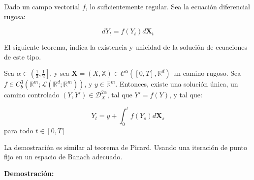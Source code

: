 Dado un campo vectorial $f$, lo suficientemente regular. Sea la ecuación diferencial rugosa:

\[
	dY_t = f(Y_t) d\mathbf{X}_t
\]

El siguiente teorema, indica la existencia y unicidad de la solución de ecuaciones de este tipo.

\begin{theorem}
	Sea $\alpha \in \left( \frac{1}{3}, \frac{1}{2} \right]$, y sea $\mathbf{X} = (X, \mathbb{X}) \in \mathscr{C}^{\alpha} ([0,T], \mathbb{R}^d)$ un camino rugoso. Sea $f \in C^3_b ( \mathbb{R}^m; \mathscr{L}( \mathbb{R}^d; \mathbb{R}^m ) )$, y $y \in \mathbb{R}^m$. Entonces, existe una solución única, un camino controlado $(Y, Y') \in \mathscr{D}^{2 \alpha}_X$, tal que $Y' = f(Y)$, y tal que:

	\[
		Y_t = y + \int_0^t f(Y_s) d\mathbf{X}_s	
	\]
	para todo $t \in [0,T]$

\end{theorem}


La demostración es similar al teorema de Picard. Usando una iteración de punto fijo en un espacio de Banach adecuado.

\textbf{Demostración:}
